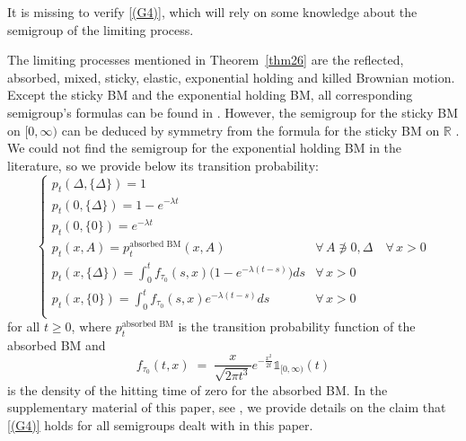 \documentclass[12pt,a4paper]{article}
\theoremstyle{plain}
\newtheorem{proposition}[theorem]{Proposition}
\theoremstyle{remark}
\newcommand{\bb}[1]{{\mathbb #1}}
\newcommand{\one}{\mathds{1}}
\begin{document}
	It is missing to verify  \ref{(G4)}, which will rely  on some knowledge about the semigroup of the limiting process.
	
	
	The limiting processes mentioned in Theorem~\ref{thm26} are the reflected, absorbed, mixed, sticky,  elastic, exponential holding and killed Brownian motion. Except the sticky BM  and the exponential holding BM, all corresponding semigroup's formulas  can be found in \citet[Appendix~1]{handbook}. However, the semigroup for the sticky BM on $[0,\infty)$ can be deduced by symmetry from the formula for the sticky BM on $\bb R$ \citep[page~123]{handbook}. We could not find the semigroup for the exponential holding BM in the literature, so we provide below its  transition probability:
	\begin{equation*}
		\begin{cases}
			p_t(\Delta, \{\Delta\}) = 1 &\\
			p_t(0, \{\Delta\}) = 1- e^{-\lambda t} & \\
			p_t(0, \{0\}) = e^{-\lambda t} & \\
			p_t(x, A) = p_t^{\text{absorbed BM}}(x,A)& \forall\,A\not\ni 0,\Delta\quad \forall\,x>0\\
			p_t(x, \{\Delta\}) = \int_{0}^t f_{\tau_0}(s,x) \big(1- e^{-\lambda (t-s)}\big)ds & \forall\,x>0\\
			p_t(x, \{0\}) = \int_{0}^t f_{\tau_0}(s,x) e^{-\lambda (t-s)}ds & \forall\,x>0\\	
		\end{cases}
	\end{equation*}
	for all $t\geq 0$, where $p_t^{\text{absorbed BM}}$ is the transition probability function of the absorbed BM and 
	\begin{equation*}
		f_{\tau_0}(t,x) \;=\; \frac{x}{\sqrt{2\pi t^3}}e^{-\frac{x^2}{2t}}\one_{[0,\infty)}(t)
	\end{equation*}
	is the density of the hitting time of zero for the absorbed BM.
	In the supplementary material of this paper, see \cite{efjp_supplement}, we provide details on the claim that \ref{(G4)} holds for all semigroups dealt with in this paper. 
	
\end{document}

